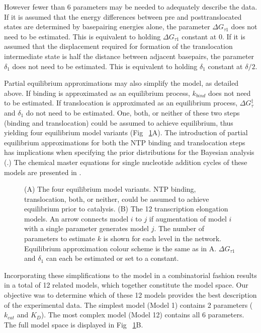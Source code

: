 \documentclass[10pt,letterpaper]{article}
\begin{document}
However fewer than 6 parameters may be needed to adequately describe the data. If it is assumed that the energy differences between pre and posttranslocated states are determined by basepairing energies alone, the parameter $\Delta G_{\tau 1}$ does not need to be estimated. This is equivalent to holding $\Delta G_{\tau 1}$ constant at 0. If it is assumed that the displacement required for formation of the translocation intermediate state is half the distance between adjacent basepairs, the parameter $\delta_1$ does not need to be estimated. This is equivalent to holding $\delta_1$ constant at $\delta/2$.

Partial equilibrium approximations may also simplify the model, as detailed above. If binding is approximated as an equilibrium process, $k_{bind}$ does not need to be estimated. If translocation is approximated as an equilibrium process,  $\Delta G^\ddag_{\tau}$ and $\delta_1$ do not need to be estimated. One, both, or neither of these two steps (binding and translocation) could be assumed to achieve equilibrium, thus yielding four equilibrium model variants (Fig ~\ref{fig4}A). The introduction of partial equilibrium approximations for both the NTP binding and translocation steps has implications when specifying the prior distributions for the Bayesian analysis (.)
 The chemical master equations for single nucleotide addition cycles of these models are presented in . \\

\begin{figure}[!h]
\caption{(A) The four equilibrium model variants. NTP binding, translocation, both, or neither, could be assumed to achieve equilibrium prior to catalysis. (B) The 12 transcription elongation models. An arrow connects model $i$ to $j$ if augmentation of model $i$ with a single parameter generates model $j$. The number of parameters to estimate  $k$ is shown for each level in the network. Equilibrium approximation colour scheme is the same as in A. $\Delta G_{\tau 1}$ and $\delta_1$ can each be estimated or set to a constant.}
\label{fig4}
\end{figure}



Incorporating these simplifications to the model in a combinatorial fashion results in a total of 12 related models, which together constitute the model space. Our objective was to determine which of these 12 models provides the best description of the experimental data. The simplest model (Model 1) contains 2 parameters ($k_{cat}$ and $K_D$). The most complex model (Model 12) contains all 6 parameters. The full model space is displayed in Fig ~\ref{fig4}B.
\end{document}
